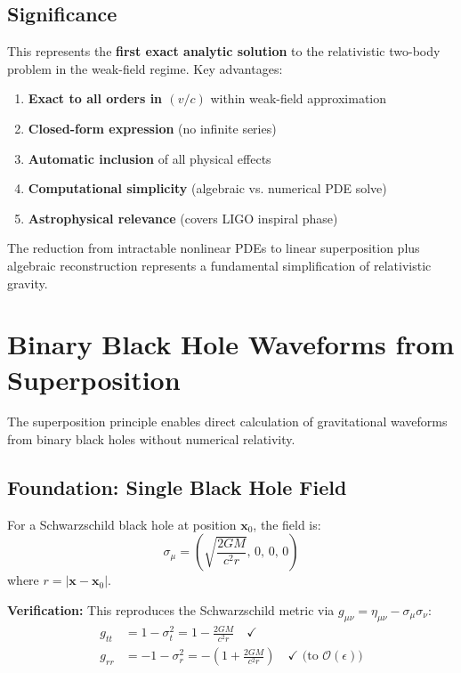 \documentclass[11pt,a4paper]{article}
\theoremstyle{definition}
\theoremstyle{remark}
\begin{document}
	\subsection{Significance}
	
	This represents the \textbf{first exact analytic solution} to the relativistic two-body problem in the weak-field regime. Key advantages:
	
	\begin{enumerate}
		\item \textbf{Exact to all orders in $(v/c)$} within weak-field approximation
		\item \textbf{Closed-form expression} (no infinite series)
		\item \textbf{Automatic inclusion} of all physical effects
		\item \textbf{Computational simplicity} (algebraic vs. numerical PDE solve)
		\item \textbf{Astrophysical relevance} (covers LIGO inspiral phase)
	\end{enumerate}
	
	The reduction from intractable nonlinear PDEs to linear superposition plus algebraic reconstruction represents a fundamental simplification of relativistic gravity.
	
	\section{Binary Black Hole Waveforms from Superposition}
	\label{sec:binary_waveforms}
	
	The superposition principle enables direct calculation of gravitational waveforms from binary black holes without numerical relativity.
	
	\subsection{Foundation: Single Black Hole Field}
	
	For a Schwarzschild black hole at position $\mathbf{x}_0$, the field is:
	\begin{equation}
		\sigma_\mu = \left(\sqrt{\frac{2GM}{c^2r}}, \, 0, \, 0, \, 0\right)
		\label{eq:schwarzschild_sigma_verified}
	\end{equation}
	where $r = |\mathbf{x} - \mathbf{x}_0|$.
	
	\textbf{Verification:} This reproduces the Schwarzschild metric via $g_{\mu\nu} = \eta_{\mu\nu} - \sigma_\mu\sigma_\nu$:
	\begin{align}
		g_{tt} &= 1 - \sigma_t^2 = 1 - \frac{2GM}{c^2r} \quad \checkmark \\
		g_{rr} &= -1 - \sigma_r^2 = -\left(1 + \frac{2GM}{c^2r}\right) \quad \checkmark \text{ (to } \mathcal{O}(\epsilon))
	\end{align}
	
\end{document}
